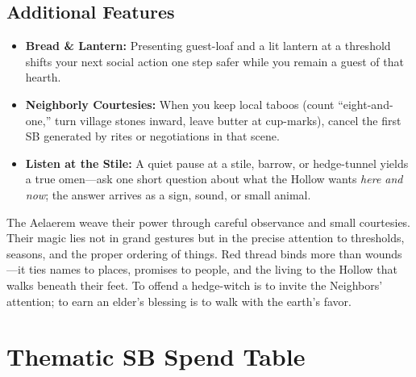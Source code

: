\subsection*{Additional Features}
\begin{itemize}
\item \textbf{Bread \& Lantern:} Presenting guest-loaf and a lit lantern at a threshold shifts your next social action one step safer while you remain a guest of that hearth.
\item \textbf{Neighborly Courtesies:} When you keep local taboos (count ``eight-and-one,'' turn village stones inward, leave butter at cup-marks), cancel the first SB generated by rites or negotiations in that scene.
\item \textbf{Listen at the Stile:} A quiet pause at a stile, barrow, or hedge-tunnel yields a true omen---ask one short question about what the Hollow wants \emph{here and now}; the answer arrives as a sign, sound, or small animal.
\end{itemize}

\begin{tcolorbox}[colback=black!3,colframe=black!40!white,title={Hearth Magic}]
The Aelaerem weave their power through careful observance and small courtesies. Their magic lies not in grand gestures but in the precise attention to thresholds, seasons, and the proper ordering of things. Red thread binds more than wounds---it ties names to places, promises to people, and the living to the Hollow that walks beneath their feet. To offend a hedge-witch is to invite the Neighbors' attention; to earn an elder's blessing is to walk with the earth's favor.
\end{tcolorbox}


\section*{Thematic SB Spend Table}
\label{sec:thematic-sb}

